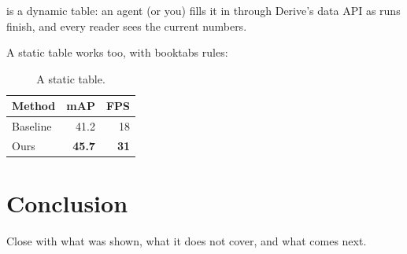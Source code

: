 \documentclass[10pt,twocolumn,letterpaper]{article}
\begin{document}
 is a dynamic table: an agent (or you) fills it in through Derive's
data API as runs finish, and every reader sees the current numbers.

\begin{table}[t]
  \centering
  \caption{Quantitative comparison on the benchmark. Higher is better.}
  \label{tab:results}
\end{table}

A static table works too, with booktabs rules:

\begin{table}[t]
  \centering
  \begin{tabular}{@{}lrr@{}}
    \toprule
    Method & mAP & FPS \\
    \midrule
    Baseline & 41.2 & 18 \\
    Ours & \textbf{45.7} & \textbf{31} \\
    \bottomrule
  \end{tabular}
  \caption{A static table.}
  \label{tab:static}
\end{table}

\section{Conclusion}

Close with what was shown, what it does not cover, and what comes next.

{
  \small
  
  
}
\end{document}
